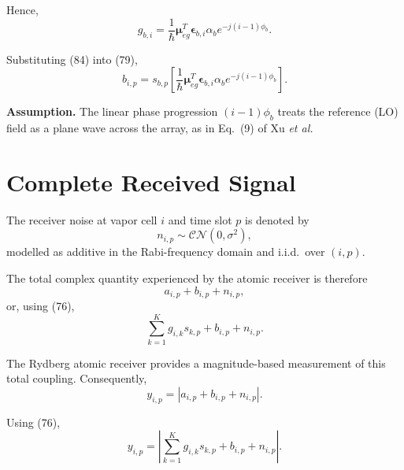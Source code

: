 \documentclass[12pt,a4paper]{article}
\begin{document}
Hence,
\begin{equation}
\boxed{
g_{b,i}
=
\frac{1}{\hbar}
\boldsymbol{\mu}_{eg}^{T}
\boldsymbol{\epsilon}_{b,i}
\alpha_b
e^{-j(i-1)\phi_b}
}.
\tag{84}
\end{equation}

Substituting (84) into (79),
\begin{equation}
\boxed{
b_{i,p}
=
s_{b,p}
\left[
\frac{1}{\hbar}
\boldsymbol{\mu}_{eg}^{T}
\boldsymbol{\epsilon}_{b,i}
\alpha_b
e^{-j(i-1)\phi_b}
\right]
}.
\tag{85}
\end{equation}

\textbf{Assumption.} The linear phase progression $(i-1)\phi_b$ treats
the reference (LO) field as a plane wave across the array, as in
Eq.~(9) of Xu \emph{et al.}

\section{Complete Received Signal}

The receiver noise at vapor cell $i$ and time slot $p$ is denoted by
\begin{equation}
n_{i,p}
\sim
\mathcal{CN}(0,\sigma^2),
\tag{86}
\end{equation}
modelled as additive in the Rabi-frequency domain and i.i.d.\ over
$(i,p)$.

The total complex quantity experienced by the atomic receiver is
therefore
\begin{equation}
a_{i,p}
+
b_{i,p}
+
n_{i,p},
\tag{87}
\end{equation}
or, using (76),
\begin{equation}
\sum_{k=1}^{K}
g_{i,k}s_{k,p}
+
b_{i,p}
+
n_{i,p}.
\tag{88}
\end{equation}

The Rydberg atomic receiver provides a magnitude-based measurement
of this total coupling. Consequently,
\begin{equation}
\boxed{
y_{i,p}
=
\left|
a_{i,p}
+
b_{i,p}
+
n_{i,p}
\right|
}.
\tag{89}
\end{equation}

Using (76),
\begin{equation}
\boxed{
y_{i,p}
=
\left|
\sum_{k=1}^{K}
g_{i,k}s_{k,p}
+
b_{i,p}
+
n_{i,p}
\right|
}.
\tag{90}
\end{equation}

\end{document}
